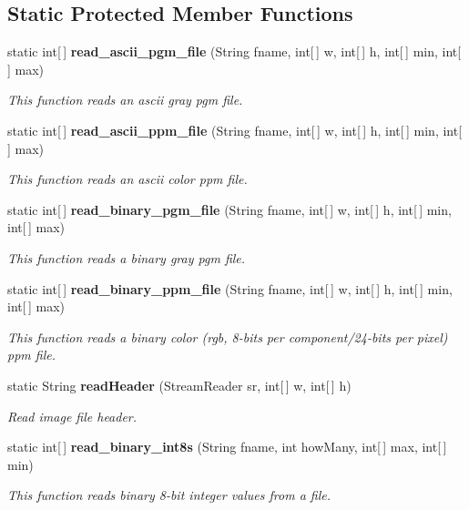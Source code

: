 \subsection*{Static Protected Member Functions}
\begin{CompactItemize}
\item 
static int[$\,$] {\bf read\_\-ascii\_\-pgm\_\-file} (String fname, int[$\,$] w, int[$\,$] h, int[$\,$] min, int[$\,$] max)
\begin{CompactList}\small\item\em This function reads an ascii gray pgm file. \item\end{CompactList}\item 
static int[$\,$] {\bf read\_\-ascii\_\-ppm\_\-file} (String fname, int[$\,$] w, int[$\,$] h, int[$\,$] min, int[$\,$] max)
\begin{CompactList}\small\item\em This function reads an ascii color ppm file. \item\end{CompactList}\item 
static int[$\,$] {\bf read\_\-binary\_\-pgm\_\-file} (String fname, int[$\,$] w, int[$\,$] h, int[$\,$] min, int[$\,$] max)
\begin{CompactList}\small\item\em This function reads a binary gray pgm file. \item\end{CompactList}\item 
static int[$\,$] {\bf read\_\-binary\_\-ppm\_\-file} (String fname, int[$\,$] w, int[$\,$] h, int[$\,$] min, int[$\,$] max)
\begin{CompactList}\small\item\em This function reads a binary color (rgb, 8-bits per component/24-bits per pixel) ppm file. \item\end{CompactList}\item 
static String {\bf read\-Header} (Stream\-Reader sr, int[$\,$] w, int[$\,$] h)
\begin{CompactList}\small\item\em Read image file header. \item\end{CompactList}\item 
static int[$\,$] {\bf read\_\-binary\_\-int8s} (String fname, int how\-Many, int[$\,$] max, int[$\,$] min)
\begin{CompactList}\small\item\em This function reads binary 8-bit integer values from a file. \item\end{CompactList}\item 

\end{CompactItemize}
